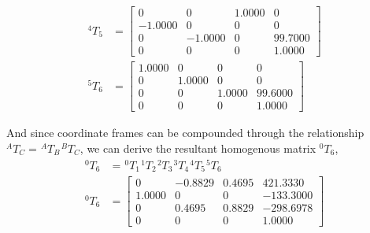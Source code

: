 \begin{equation*}
\begin{split}
        ^{4}T_{5} & = \begin{bmatrix}
                          0       & 0       & 1.0000 & 0       \\
                          -1.0000 & 0       & 0      & 0       \\
                          0       & -1.0000 & 0      & 99.7000 \\
                          0       & 0       & 0      & 1.0000
                      \end{bmatrix}  \\
        ^{5}T_{6} & = \begin{bmatrix}
                          1.0000 & 0      & 0      & 0       \\
                          0      & 1.0000 & 0      & 0       \\
                          0      & 0      & 1.0000 & 99.6000 \\
                          0      & 0      & 0      & 1.0000
                      \end{bmatrix}
    \end{split}
\end{equation*}

And since coordinate frames can be compounded through the relationship $^{A}T_{C} =\hspace{1pt} ^{A}T_{B} \hspace{1pt} ^{B}T_{C}$, we can derive the resultant homogenous matrix $^{0}T_{6}$,
\begin{equation*}
    \begin{split}
        ^{0}T_{6} & = \hspace{1pt} ^{0}T_{1} \hspace{1pt} ^{1}T_{2}\hspace{1pt} ^{2}T_{3}\hspace{1pt} ^{3}T_{4}\hspace{1pt} ^{4}T_{5}\hspace{1pt} ^{5}T_{6} \\
        ^{0}T_{6} & = \begin{bmatrix}
                          0      & -0.8829 & 0.4695 & 421.3330  \\
                          1.0000 & 0       & 0      & -133.3000 \\
                          0      & 0.4695  & 0.8829 & -298.6978 \\
                          0      & 0       & 0      & 1.0000
                      \end{bmatrix}
    \end{split}
\end{equation*}

